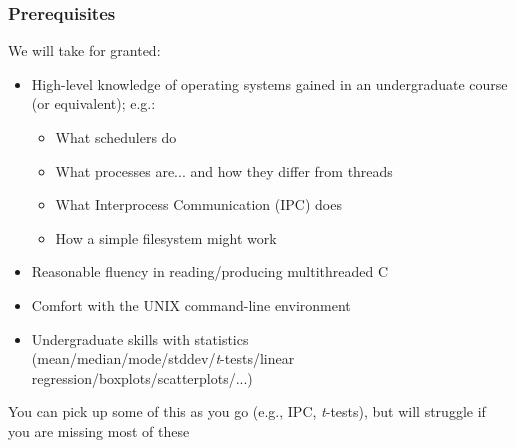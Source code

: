 \begin{frame}
  \frametitle{Prerequisites}

  We will take for granted:
  \bigskip

  \begin{itemize}
    \item High-level knowledge of operating systems gained in an undergraduate
      course (or equivalent); e.g.:
    \begin{itemize}
      \item What schedulers do
      \item What processes are... and how they differ from threads
      \item What Interprocess Communication (IPC) does
      \item How a simple filesystem might work
    \end{itemize}
    \item Reasonable fluency in reading/producing multithreaded C
    \item Comfort with the UNIX command-line environment
    \item Undergraduate skills with statistics \\
      {\tiny (mean/median/mode/stddev/\textit{t}-tests/linear regression/boxplots/scatterplots/...)}
  \end{itemize}

  \pause
  \bigskip
  You can pick up some of this as you go (e.g., IPC, \textit{t}-tests), but
  will struggle if you are missing most of these
\end{frame}

